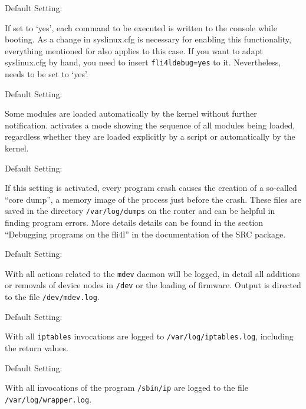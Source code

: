 \begin{description}

  
    Default Setting: 

    If set to `yes', each command to be executed is written to the console
    while booting. As a change in syslinux.cfg is necessary for enabling
    this functionality, everything mentioned for 
    also applies to this case. If you want to adapt syslinux.cfg by hand, you
    need to insert \verb+fli4ldebug=yes+ to it. Nevertheless,
     needs to be set to `yes'.

    
    Default Setting: 
    
    Some modules are loaded automatically by the kernel without further
    notification.  activates a mode showing the
    sequence of all modules being loaded, regardless whether they are
    loaded explicitly by a script or automatically by the kernel.

    
    Default Setting: 
    
    If this setting is activated, every program crash causes the creation of
    a so-called ``core dump'', a memory image of the process just before
    the crash. These files are saved in the directory \texttt{/var/log/dumps}
    on the router and can be helpful in finding program errors. More details
    details can be found in the section 
    {``Debugging programs on the fli4l''} in the documentation of the SRC
    package.

    
    Default Setting: 
    
    With  all actions related to the \texttt{mdev}
    daemon will be logged, in detail all additions or removals of device
    nodes in \texttt{/dev} or the loading of firmware. Output is directed
    to the file \texttt{/dev/mdev.log}.

    
    Default Setting: 
    
    With  all \texttt{iptables} invocations are
    logged to \texttt{/var/log/iptables.log}, including the return values.

    
    Default Setting: 
    
    With  all invocations of the program \texttt{/sbin/ip}
    are logged to the file \texttt{/var/log/wrapper.log}.

\end{description}
